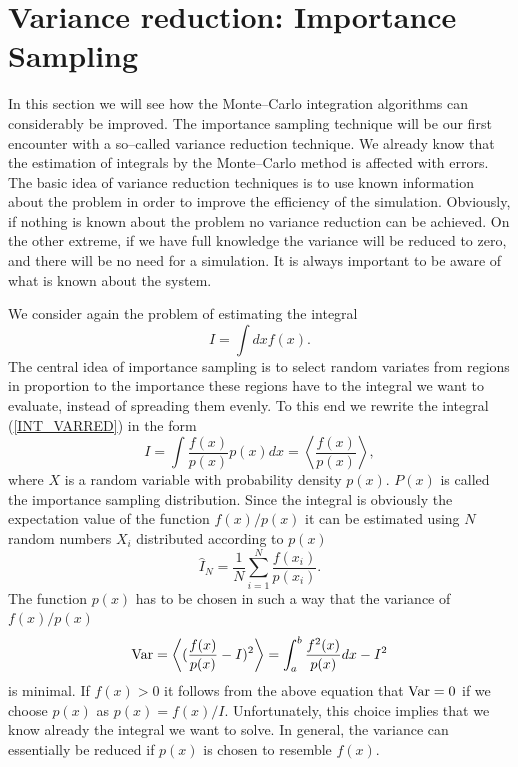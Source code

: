 
\section{Variance reduction: Importance Sampling}
In this section we will see how the Monte--Carlo integration
algorithms can considerably be improved. The importance sampling 
technique will be our first encounter with a so--called variance 
reduction technique. We already know that the estimation of 
integrals by the Monte--Carlo method is affected with errors. The
basic idea of variance reduction techniques is to use known 
information about the problem in order to improve the efficiency 
of the simulation. Obviously, if nothing is known about the 
problem no variance reduction can be achieved. On the other 
extreme, if we have full knowledge the variance will be reduced to 
zero, and there will be no need for a simulation. It is always 
important to be aware of what is known about the system.

We consider again the problem of estimating the integral
\begin{equation}
\label{INT_VARRED}
I = \int dx f(x).
\end{equation}
The central idea of importance sampling is to select random 
variates from regions in proportion to the importance these 
regions have to the integral we want to evaluate, instead of 
spreading them evenly. To this end we rewrite the integral 
(\ref{INT_VARRED}) in the form
\begin{equation*}
I = \int \frac{f(x)}{p(x)} p(x) dx = \left\langle 
\frac{f(x)}{p(x)}\right\rangle,
\end{equation*}
where $X$ is a random variable with probability density $p(x)$.
$P(x)$ is called the importance sampling distribution.  Since the
integral is obviously the expectation value of the function $f(x)/p(x)$
it can be estimated using $N$ random numbers $X_i$ distributed 
according to $p(x)$
\begin{equation*}
\hat{I}_N = \frac{1}{N} \sum_{i=1}^N \frac{f(x_i)}{p(x_i)}.
\end{equation*}
The function $p(x)$ has to be chosen in such a way that the 
variance of $f(x)/p(x)$ 
\begin{equation*}
{\rm Var} = \left\langle (\frac{f(x)}{p(x)}-I)^2\right\rangle
   = \int_a^b \frac{f^2(x)}{p(x)}dx - I^2
\end{equation*}
is minimal. If $f(x)>0$ it follows from the above equation that
${\rm Var}=0$ if we choose $p(x)$ as $p(x) = f(x)/I$. 
Unfortunately, this choice implies that we know already 
the integral we want to solve. In general, the variance can 
essentially be reduced if $p(x)$ is chosen to resemble $f(x)$.

